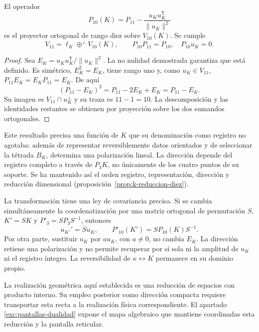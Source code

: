 \begin{proposition}
\label{prop:k-reduccion-diez}
El operador
\begin{equation}
 P_{10}(K)=P_{11}
       -\frac{u_Ku_K^{\mathsf T}}{\lVert u_K\rVert^2}
 \label{eq:k-proyector-diez}
\end{equation}
es el proyector ortogonal de rango diez sobre \(V_{10}(K)\). Se cumple
\[
 V_{11}=\ell_K\mathbin{\oplus^{\perp}}V_{10}(K),
 \qquad P_{10}P_{11}=P_{10},\quad P_{10}u_K=0.
\]
\end{proposition}
\begin{proof}
Sea \(E_K=u_Ku_K^{\mathsf T}/\lVert u_K\rVert^2\). La
no nulidad demostrada garantiza que está definido. Es simétrico,
\(E_K^2=E_K\), tiene rango uno y, como \(u_K\in V_{11}\),
\(P_{11}E_K=E_KP_{11}=E_K\). De aquí
\[
 (P_{11}-E_K)^2=P_{11}-2E_K+E_K=P_{11}-E_K.
\]
Su imagen es \(V_{11}\cap u_K^\perp\) y su traza es
\(11-1=10\). La descomposición y las identidades restantes se
obtienen por proyección sobre los dos sumandos ortogonales.
\end{proof}

Este resultado precisa una función de \(K\) que su denominación como
registro no agotaba: además de representar reversiblemente datos
orientados y de seleccionar la tétrada \(B_K\), determina una
polarización lineal. La dirección depende del registro completo a
través de \(P_3K\), no únicamente de los cuatro puntos de su soporte.
Se ha mantenido así el orden registro, representación, dirección y
reducción dimensional (proposición~\ref{prop:k-reduccion-diez}).

La transformación tiene una ley de covariancia precisa. Si se cambia
simultáneamente la coordenatización por una matriz ortogonal de permutación \(S\),
\(K'=SK\) y \(P'_3=SP_3S^{-1}\), entonces
\[
 u_{K'}'=Su_K,\qquad P'_{10}(K')=SP_{10}(K)S^{-1}.
\]
Por otra parte, sustituir \(u_K\) por \(a u_K\), con \(a\ne0\),
no cambia \(E_K\). La dirección retiene una polarización y no
permite recuperar por sí sola ni la amplitud de \(u_K\) ni el
registro íntegro. La reversibilidad de \(\kappa\leftrightarrow K\)
permanece en su dominio propio.

La realización geométrica aquí establecida es una reducción de espacios
con producto interno. Su empleo posterior como dirección compacta
requiere transportar esta recta a la realización física correspondiente.
El apartado \ref{exc:pantallas-dualidad} expone el mapa algebraico
que mantiene coordinadas esta reducción y la pantalla reticular.
